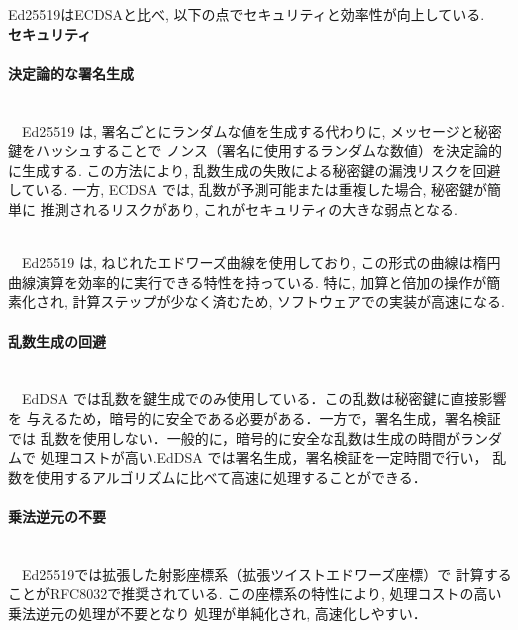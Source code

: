 Ed25519はECDSAと比べ, 以下の点でセキュリティと効率性が向上している.\\[1em]
{\large\textbf{セキュリティ}}\\
\noindent\paragraph{決定論的な署名生成} \leavevmode\\
　Ed25519 は, 署名ごとにランダムな値を生成する代わりに, 
メッセージと秘密鍵をハッシュすることで 
ノンス（署名に使用するランダムな数値）を決定論的に生成する.
この方法により, 乱数生成の失敗による秘密鍵の漏洩リスクを回避している.
一方, ECDSA では, 乱数が予測可能または重複した場合, 秘密鍵が簡単に
推測されるリスクがあり, これがセキュリティの大きな弱点となる.
\par
\vspace{1em}
\\[1em]
　Ed25519 は, ねじれたエドワーズ曲線を使用しており, 
この形式の曲線は楕円曲線演算を効率的に実行できる特性を持っている.
特に, 加算と倍加の操作が簡素化され, 計算ステップが少なく済むため, 
ソフトウェアでの実装が高速になる.\\

\noindent\paragraph{乱数生成の回避} \leavevmode\\
　EdDSA では乱数を鍵生成でのみ使用している．この乱数は秘密鍵に直接影響を
与えるため，暗号的に安全である必要がある．一方で，署名生成，署名検証では
乱数を使用しない．一般的に，暗号的に安全な乱数は生成の時間がランダムで
処理コストが高い.EdDSA では署名生成，署名検証を一定時間で行い，
乱数を使用するアルゴリズムに比べて高速に処理することができる．\\

\noindent\paragraph{乗法逆元の不要} \leavevmode\\
　Ed25519では拡張した射影座標系（拡張ツイストエドワーズ座標）で
計算することがRFC8032で推奨されている.
この座標系の特性により, 処理コストの高い乗法逆元の処理が不要となり
処理が単純化され, 高速化しやすい．

